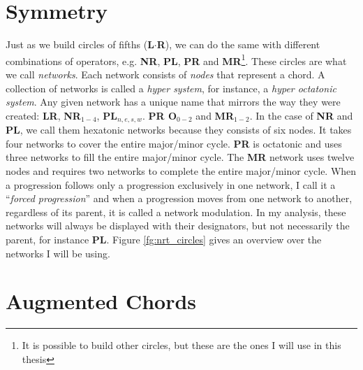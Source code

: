 \section{Symmetry}
Just as we build circles of fifths (\textbf{L\(\cdot\)R}), we can do the same with different combinations of operators, e.g. \textbf{NR}, \textbf{PL}, \textbf{PR} and \textbf{MR}\footnote{It is possible to build other circles, but these are the ones I will use in this thesis}. These circles are what we call \textit{networks}. Each network consists of \textit{nodes} that represent a chord. A collection of networks is called a \textit{hyper system}, for instance, a \textit{hyper octatonic system}. Any given network has a unique name that mirrors the way they were created: \textbf{LR}, \textbf{NR\(_{1-4}\)}, \textbf{PL\(_{n,e,s,w}\)}. \textbf{PR O\(_{0-2}\)} and \textbf{MR\(_{1-2}\)}. In the case of \textbf{NR} and \textbf{PL}, we call them hexatonic networks because they consists of six nodes. It takes four networks to cover the entire major/minor cycle. \textbf{PR} is octatonic and uses three networks to fill the entire major/minor cycle. The \textbf{MR} network uses twelve nodes and requires two networks to complete the entire major/minor cycle. When a progression follows only a progression exclusively in one network, I call it a ``\textit{forced progression}'' and when a progression moves from one network to another, regardless of its parent, it is called a network modulation. In my analysis, these networks will always be displayed with their designators, but not necessarily the parent, for instance \textbf{PL}. Figure \ref{fg:nrt_circles} gives an overview over the networks I will be using.




\section{Augmented Chords}

